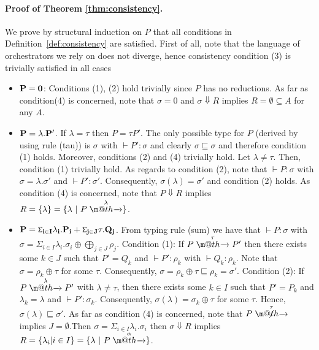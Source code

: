 \documentclass[submission,copyright,creativecommons]{eptcs}
\makeatletter
\newcommand{\act}{\lambda}
\newcommand{\tr}[1]{\stackrel{#1}{\rightarrowfill}}
\def \rightarrowfill{\m@th\mathord{\smash-}\mkern-6mu\cleaders\hbox{$\mkern-2mu\mathord{\smash-}\mkern-2mu$}\hfill
  \mkern-6mu\mathord\rightarrow}
\makeatother
\begin{document}
\paragraph{Proof of Theorem \ref{thm:consistency}.}
We prove by structural induction on  $P$ that all conditions in Definition~\ref{def:consistency} are satisfied.
First of all, note that the language of orchestrators we rely on does not diverge, hence consistency condition (3) is trivially satisfied in all cases
    \begin{itemize}   
      \item ${\bf P = 0}$: Conditions (1), (2) hold trivially since $P$ has no reductions. As far as condition(4) is concerned, note that $\sigma = 0$ and $\sigma \Downarrow R$ implies $R = \emptyset \subseteq A$ for any $A$.  

      \item ${\bf P = \lambda.P'}$. If $\lambda = \tau$ then $P= \tau P'$. The only possible type for $P$ (derived by using rule {\sc (tau)}) is $\sigma$ with $\vdash P': \sigma$ and clearly $\sigma \sqsubseteq \sigma$ and therefore condition (1) holds. Moreover, conditions (2) and (4) trivially hold. Let $\lambda \neq \tau$. Then, condition (1) trivially hold. As regards to condition (2), note that $\vdash P:\sigma$ with $\sigma = \lambda.\sigma'$ and
      $\vdash P' : \sigma'$. Consequently, $\sigma(\lambda)=\sigma'$ and condition (2) holds. As condition (4) is concerned, note that $P\Downarrow R$ implies $R=\{\lambda\} = \{\lambda \ |\ P\tr{\lambda}\}$.

      \item ${\bf P = \mathtt{\Sigma}_{i\in I} \act_i.P_i + \mathtt{\Sigma}_{j \in J} \tau.Q_j}$. From typing rule {\sc (sum)} we have that $\vdash P: \sigma$ with $\sigma = \Sigma_{i \in I} \act_i.\sigma_i \oplus \bigoplus_{j\in J}\rho_j$. Condition (1): If $P \tr{\tau} P'$ then there exists some $k \in J$ such that $P' = Q_k$  and $\vdash P': \rho_k$ with $\vdash Q_k: \rho_k$. Note that $\sigma =  \rho_k \oplus \tau$ for some $\tau$. Consequently, 
      $\sigma = \rho_k \oplus \tau \sqsubseteq \rho_k = \sigma'$. Condition (2): If $P \tr{\lambda} P'$ with $\lambda \neq \tau$, then there exists some $k \in I$ such that $P' = P_k$  and $\act_k = \lambda$ and $\vdash P': \sigma_k$. Consequently, $\sigma(\lambda) = \sigma_k \oplus \tau$ for some $\tau$. Hence, $\sigma(\lambda)\sqsubseteq\sigma'$. As far as condition (4) is concerned, note that $P\centernot{\tr{\tau}}$ implies $J = \emptyset$.Then $\sigma = \Sigma_{i \in I} \act_i.\sigma_i$ then $\sigma\Downarrow R$ implies $R = \{\act_i | i\in I\} =\{ \act \ |\ P \tr{\alpha} \}$.   
         

\end{itemize}
\end{document}
